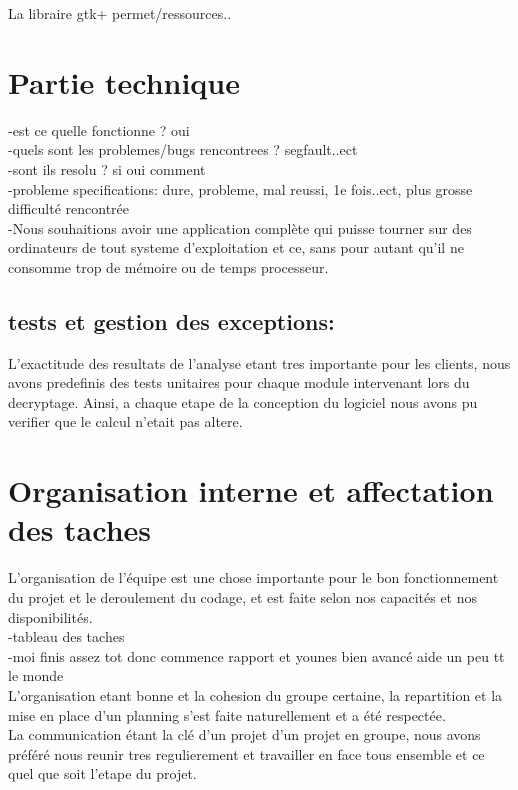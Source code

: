 \documentclass[a4]{article}
\begin{document}
La libraire gtk+ permet/ressources..

	\section{Partie technique}
		-est ce quelle fonctionne ? oui \\
		-quels sont les problemes/bugs rencontrees ? segfault..ect  \\
		-sont ils resolu ? si oui comment  \\
		-probleme specifications: dure, probleme, mal reussi, 1e fois..ect, plus grosse difficulté rencontrée  \\
		-Nous souhaitions avoir une application complète qui puisse tourner sur des ordinateurs 
de tout systeme d'exploitation et ce, sans pour autant qu’il ne
consomme trop de mémoire ou de temps processeur. 
		\subsection{tests et gestion des exceptions:}
		L’exactitude des resultats de l'analyse etant tres importante pour les clients, nous avons predefinis des tests
unitaires pour chaque module intervenant lors du decryptage. Ainsi, a chaque etape de la conception du logiciel
nous avons pu verifier que le calcul n’etait pas altere.
		
	\section{Organisation interne et affectation des taches}
	L'organisation de l'équipe est une chose importante pour le bon fonctionnement du
projet et le deroulement du codage, et est faite selon nos capacités et nos disponibilités.  \\
		-tableau des taches  \\
		-moi finis assez tot donc commence rapport et younes bien avancé aide un peu tt le monde \\
		L'organisation etant bonne et la cohesion du groupe certaine, la repartition et la mise en place d'un planning s'est faite naturellement et a été respectée.  \\
		La communication étant la clé d'un projet d'un projet en groupe, nous avons préféré nous reunir tres regulierement et travailler en face tous ensemble et ce quel que soit l'etape du projet.
\end{document}
